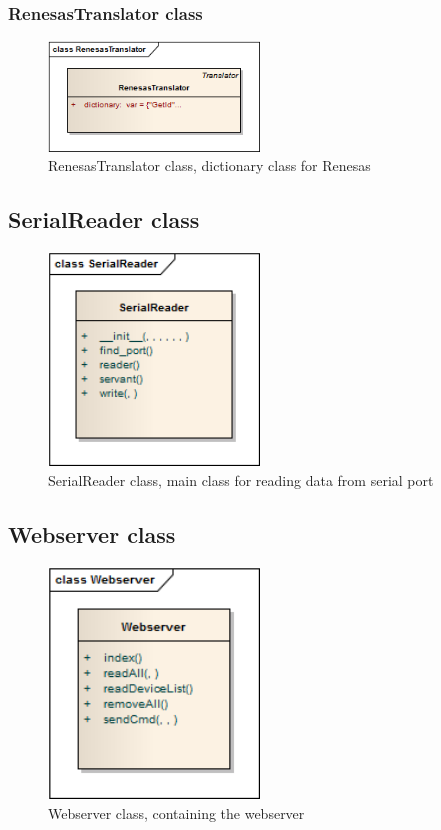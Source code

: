 \subsubsection{RenesasTranslator class}
\begin{figure}[H]
   \centering
   \includegraphics[width=0.5\textwidth]{pic/RenesasTranslator.png}%
   \caption{RenesasTranslator class, dictionary class for Renesas}
   \label{RenesasTranslatorpic}%
\end{figure}

\newpage
\subsection{SerialReader class}
\begin{figure}[H]
   \centering
   \includegraphics[width=0.5\textwidth]{pic/SerialReader.png}%
   \caption{SerialReader class, main class for reading data from serial port}
   \label{SerialReaderpic}%
\end{figure}

\newpage
\subsection{Webserver class}
\begin{figure}[H]
   \centering
   \includegraphics[width=0.5\textwidth]{pic/Webserver.png}%
   \caption{Webserver class, containing the webserver}
   \label{Webserverpic}%
\end{figure}

